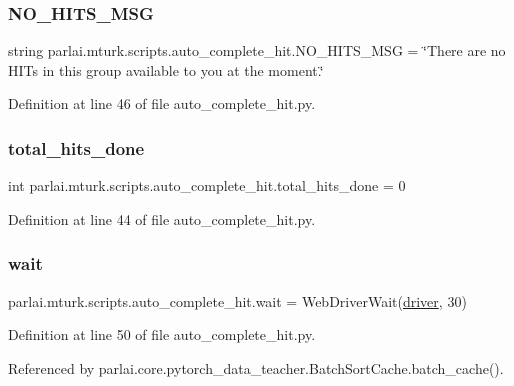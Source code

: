 \subsubsection{\texorpdfstring{N\+O\+\_\+\+H\+I\+T\+S\+\_\+\+M\+SG}{NO\_HITS\_MSG}}
{\footnotesize\ttfamily string parlai.\+mturk.\+scripts.\+auto\+\_\+complete\+\_\+hit.\+N\+O\+\_\+\+H\+I\+T\+S\+\_\+\+M\+SG = \char`\"{}There are no H\+I\+Ts in this group available to you at the moment.\char`\"{}}



Definition at line 46 of file auto\+\_\+complete\+\_\+hit.\+py.

\mbox{\label{namespaceparlai_1_1mturk_1_1scripts_1_1auto__complete__hit_a5e0869eaab0170f523d6b5fea648b1a1}} 
\subsubsection{\texorpdfstring{total\+\_\+hits\+\_\+done}{total\_hits\_done}}
{\footnotesize\ttfamily int parlai.\+mturk.\+scripts.\+auto\+\_\+complete\+\_\+hit.\+total\+\_\+hits\+\_\+done = 0}



Definition at line 44 of file auto\+\_\+complete\+\_\+hit.\+py.

\mbox{\label{namespaceparlai_1_1mturk_1_1scripts_1_1auto__complete__hit_a41016a44ce805b615732efe5c479551c}} 
\subsubsection{\texorpdfstring{wait}{wait}}
{\footnotesize\ttfamily parlai.\+mturk.\+scripts.\+auto\+\_\+complete\+\_\+hit.\+wait = Web\+Driver\+Wait(\hyperlink{namespaceparlai_1_1mturk_1_1scripts_1_1auto__complete__hit_aa84d687a4e23d5c4cb07ab0c07396a5c}{driver}, 30)}



Definition at line 50 of file auto\+\_\+complete\+\_\+hit.\+py.



Referenced by parlai.\+core.\+pytorch\+\_\+data\+\_\+teacher.\+Batch\+Sort\+Cache.\+batch\+\_\+cache().

